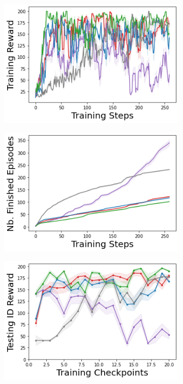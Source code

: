 \begin{figure}
    \begin{subfigure}{.3\textwidth}
        \includegraphics[width=\textwidth]{sections/011_icml2022/resources/cartpole-training_total_reward-training-model+.png}
    \end{subfigure}
    \begin{subfigure}{.3\textwidth}
        \includegraphics[width=\textwidth]{sections/011_icml2022/resources/cartpole-n_finished_training_episodes-training-model+.png}
    \end{subfigure}
    \begin{subfigure}{.3\textwidth}
        \includegraphics[width=\textwidth]{sections/011_icml2022/resources/CartPole-v0-mean_reward_-testing-model+.png}

\end{subfigure}
\end{figure}
